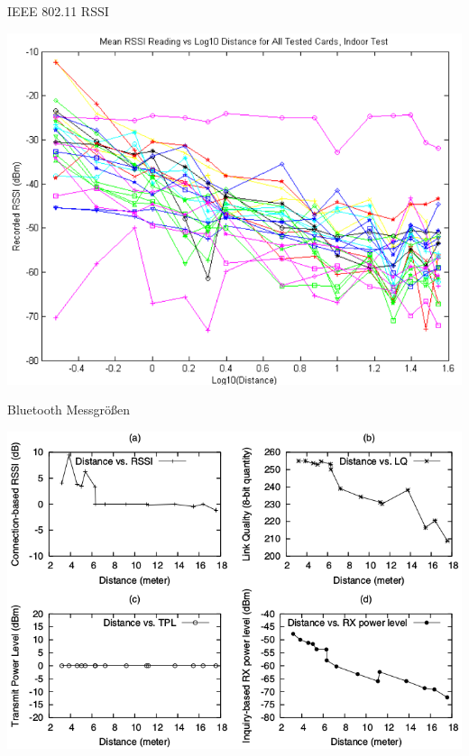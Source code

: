 \documentclass[18pt]{beamer}
\begin{document}
\begin{frame}{IEEE 802.11 RSSI}%
	\begin{minipage}[t][\textheight][t]{\textwidth}
		\centering
		\includegraphics[height=0.8\textheight]{images/luiRSSI.png}
	\end{minipage}
\end{frame}

\begin{frame}{Bluetooth Messgrößen}%
	\begin{minipage}[t][\textheight][t]{\textwidth}
		\centering
		\includegraphics[height=0.8\textheight]{images/bluetoothmess.png}
	\end{minipage}
\end{frame}
\end{document}
